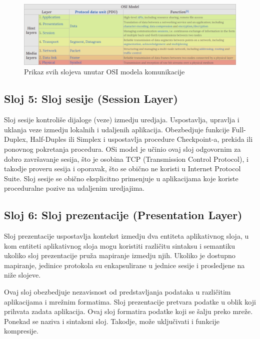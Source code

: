 \documentclass[a4paper,12pt, master]{etf}
\begin{document}
	\begin{figure}[htb]
			\centering
			\includegraphics[scale=.43]{../pic/osi_model.png}
			\caption{Prikaz svih slojeva unutar OSI modela komunikacije}
			\label{fig:osi_model}
	\end{figure}

	\subsection{Sloj 5: Sloj sesije (Session Layer)}

	Sloj sesije kontroli\v{s}e dijaloge (veze) izmedju uredjaja. Uspostavlja,
	upravlja i uklanja veze izmedju lokalnih i udaljenih aplikacija.
	Obezbedjuje funkcije Full-Duplex, Half-Duples ili Simplex i uspostavlja
	procedure Checkpoint-a, prekida ili ponovnog pokretanja procedura. OSi
	model je u\v{c}inio ovaj sloj odgovornim za dobro zavr\v{s}avanje sesija,
	\v{s}to je osobina TCP (Transmission Control Protocol), i takodje proveru
	sesija i oporavak, \v{s}to se obi\v{c}no ne koristi u Internet Protocol
	Suite. Sloj sesije se obi\v{c}no eksplicitno primenjuje u aplikacijama koje
	koriste proceduralne pozive na udaljenim uredjajima.

	\subsection{Sloj 6: Sloj prezentacije (Presentation Layer)}

	Sloj prezentacije uspostavlja kontekst izmedju dva entiteta aplikativnog
	sloja, u kom entiteti aplikativnog sloja mogu koristiti razli\v{c}itu
	sintaksu i semantiku ukoliko sloj prezentacije pru\v{z}a mapiranje izmedju
	njih. Ukoliko je dostupno mapiranje, jedinice protokola su enkapsulirane u
	jednice sesije i prosledjene na ni\v{z}e slojeve.

	Ovaj sloj obezbedjuje nezavisnost od predstavljanja podataka u
	razli\v{c}itim aplikacijama i mre\v{z}nim formatima. Sloj prezentacije
	pretvara podatke u oblik koji prihvata zadata aplikacija. Ovaj sloj
	formatira podatke koji se \v{s}alju preko mre\v{z}e. Ponekad se naziva i
	sintaksni sloj.	Takodje, mo\v{z}e uklju\v{c}ivati i funkcije kompresije.
\end{document}
